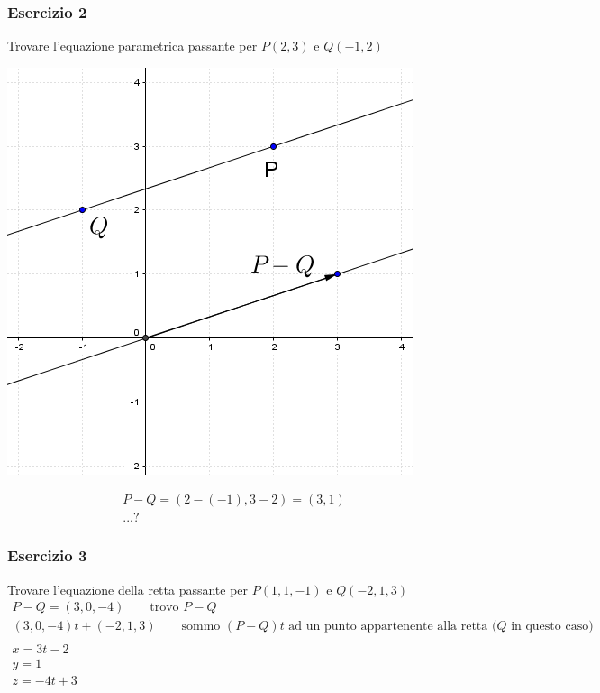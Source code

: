 \documentclass[italian]{article}
\begin{document}
\subsubsection{Esercizio 2} 
Trovare l'equazione parametrica passante per $P(2,3)$ e $Q(-1,2)$
\begin{center}
	\includegraphics[width=0.4\linewidth]{img/vettori_rette_parametriche.png}
\end{center}
\begin{gather*}
	P-Q = (2-(-1), 3-2) = (3,1)\\
	...?
\end{gather*}

\pagebreak
\subsubsection{Esercizio 3} 
Trovare l'equazione della retta passante per $P(1,1,-1)$ e $Q(-2,1,3)$
\begin{gather*}
	P-Q = (3,0,-4) \qquad \text{trovo $P-Q$}\\
	(3,0,-4)t + (-2,1,3) \qquad \text{sommo $(P-Q)t$ ad un punto appartenente alla retta ($Q$ in questo caso)}\\\\
	x = 3t - 2 \\
	y = 1\\
	z = -4t + 3
\end{gather*}\\\\
\end{document}
